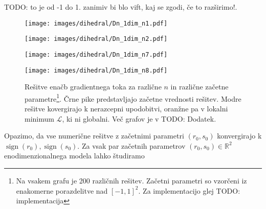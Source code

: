 \documentclass[mat2, tisk]{fmfdelo}
\newcommand{\TODO}[1]{{\color{blue} TODO: #1}}
\newcommand{\R}{\mathbb R}
\newcommand{\loss }{\mathcal L}
\begin{document}
      \TODO{to je od -1 do 1. zanimiv bi blo vift, kaj se zgodi, če
      to razširimo!}.
      \begin{figure}[h!]
        \centering
        \begin{minipage}{0.49\textwidth}
          \centering
          \texttt{[image: images/dihedral/Dn\_1dim\_n1.pdf]}
          \caption*{$n=1$}
        \end{minipage}
        \centering
        \begin{minipage}{0.49\textwidth}
          \centering
          \texttt{[image: images/dihedral/Dn\_1dim\_n2.pdf]}
          \caption*{$n=2$}
        \end{minipage}
        \vspace{0.5em}
        \centering
        \begin{minipage}{0.49\textwidth}
          \centering
          \texttt{[image: images/dihedral/Dn\_1dim\_n7.pdf]}
          \caption*{$n=7$}
        \end{minipage}
        \centering
        \begin{minipage}{0.49\textwidth}
          \centering
          \texttt{[image: images/dihedral/Dn\_1dim\_n8.pdf]}
          \caption*{$n=8$}
        \end{minipage}
        \caption[Rešitve enačb gradientnega toka za različne $n$ in
          različne začetne parametre. Črne pike predstavljajo začetne
          vrednosti rešitev. Modre rešitve kovergirajo k nerazcepni
          upodobitvi, oranžne pa v lokalni minimum $\loss$, ki ni globalni.
        Več grafov je v \TODO{Dodatek}.]{Rešitve enačb gradientnega
          toka za različne $n$ in različne začetne
          parametre\footnote{Na vsakem grafu je 200 različnih
            rešitev. Začetni parametri so vzorčeni iz enakomerne
            porazdelitve nad $[-1,1]^2$. Za implementacijo glej
          \TODO{implementacija}}.
          Črne pike predstavljajo začetne vrednosti rešitev. Modre
          rešitve kovergirajo k nerazcepni upodobitvi, oranžne pa v
          lokalni minimum $\loss$, ki ni globalni.
        Več grafov je v \TODO{Dodatek}.}
        \label{fig:Dn-trajektorije-demo}
      \end{figure}
      Opazimo, da vse numerične rešitve z začetnimi parametri $(r_0,
      s_0)$ konvergirajo k $\operatorname{sign}(r_0),
      \operatorname{sign}(s_0)$. Za vsak par začetnih parametrov
      $(r_0, s_0) \in \R^2$ enodimenzionalnega modela lahko študiramo
\end{document}
